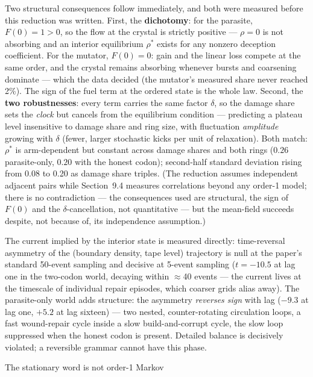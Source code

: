 Two structural consequences follow immediately, and both were
measured before this reduction was written. First, the {\bf
dichotomy}: for the parasite, $F(0)=1>0$, so the flow at the
crystal is strictly positive --- $\rho=0$ is not absorbing and an
interior equilibrium $\rho^*$ exists for any nonzero deception
coefficient. For the mutator, $F(0)=0$: gain and the linear loss
compete at the same order, and the crystal remains absorbing
whenever bursts and coarsening dominate --- which the data decided
(the mutator's measured share never reached 2\%). The sign of the
fuel term at the ordered state is the whole law. Second, the {\bf
two robustnesses}: every term carries the same factor $\delta$, so
the damage share sets the {\it clock} but cancels from the
equilibrium condition --- predicting a plateau level insensitive
to damage share and ring size, with fluctuation {\it amplitude}
growing with $\delta$ (fewer, larger stochastic kicks per unit of
relaxation). Both match: $\rho^*$ is arm-dependent but constant across
damage shares and both rings ($0.26$ parasite-only, $0.20$ with
the honest codon); second-half standard deviation
rising from 0.08 to 0.20 as damage share triples. (The reduction
assumes independent adjacent pairs while Section~9.4 measures
correlations beyond any order-1 model; there is no contradiction
--- the consequences used are structural, the sign of $F(0)$ and
the $\delta$-cancellation, not quantitative --- but the mean-field
succeeds despite, not because of, its independence assumption.)

The current implied by the interior state is measured directly:
time-reversal asymmetry of the (boundary density, tape level)
trajectory is null at the paper's standard 50-event sampling and
decisive at 5-event sampling ($t=-10.5$ at lag one in the
two-codon world, decaying within $\approx$40 events --- the
current lives at the timescale of individual repair episodes,
which coarser grids alias away). The parasite-only world adds
structure: the asymmetry {\it reverses sign} with lag ($-9.3$ at
lag one, $+5.2$ at lag sixteen) --- two nested, counter-rotating
circulation loops, a fast wound-repair cycle inside a slow
build-and-corrupt cycle, the slow loop suppressed when the honest
codon is present. Detailed balance is decisively violated; a
reversible grammar cannot have this phase.

\secc The stationary word is not order-1 Markov

